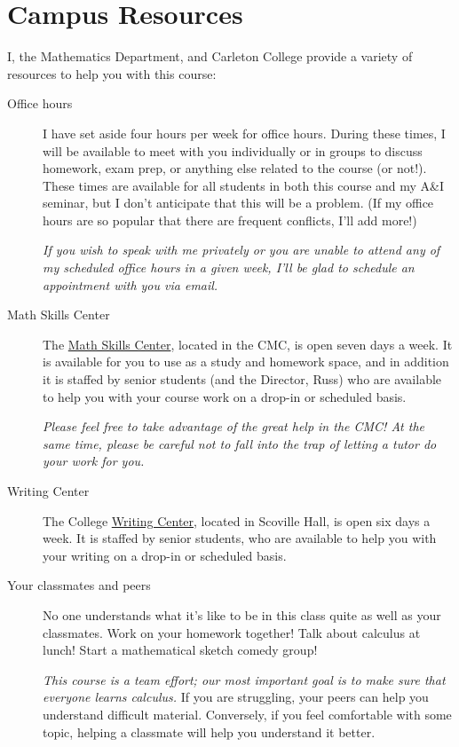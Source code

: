 \documentclass[11pt,article]{memoir}
\begin{document}
\section*{Campus Resources}
I, the Mathematics Department, and Carleton College provide a variety of resources to help you with this course:
\begin{description}
\item[Office hours]
  I have set aside four hours per week for office hours.
  During these times, I will be available to meet with you individually or in groups to discuss homework, exam prep, or anything else related to the course (or not!).
  These times are available for all students in both this course and my A\&I seminar, but I don't anticipate that this will be a problem.
  (If my office hours are so popular that there are frequent conflicts, I'll add more!)

  \emph{If you wish to speak with me privately or you are unable to attend any of my scheduled office hours in a given week, I'll be glad to schedule an appointment with you via email.}

\item[Math Skills Center]
  The \href{https://apps.carleton.edu/campus/asc/msc/}{Math Skills Center}, located in the CMC, is open seven days a week.
  It is available for you to use as a study and homework space, and in addition it is staffed by senior students (and the Director, Russ) who are available to help you with your course work on a drop-in or scheduled basis.

  \emph{Please feel free to take advantage of the great help in the CMC!
    At the same time, please be careful not to fall into the trap of letting a tutor do your work for you.}

\item[Writing Center]
  The College \href{https://apps.carleton.edu/campus/asc/writingcenter/}{Writing Center}, located in Scoville Hall, is open six days a week.
  It is staffed by senior students, who are available to help you with your writing on a drop-in or scheduled basis.

\item[Your classmates and peers]
  No one understands what it's like to be in this class quite as well as your classmates.
  Work on your homework together!
  Talk about calculus at lunch!
  Start a mathematical sketch comedy group!

  \emph{This course is a team effort; our most important goal is to make sure that everyone learns calculus.}
  If you are struggling, your peers can help you understand difficult material.
  Conversely, if you feel comfortable with some topic, helping a classmate will help you understand it better.
\end{description}
\end{document}
